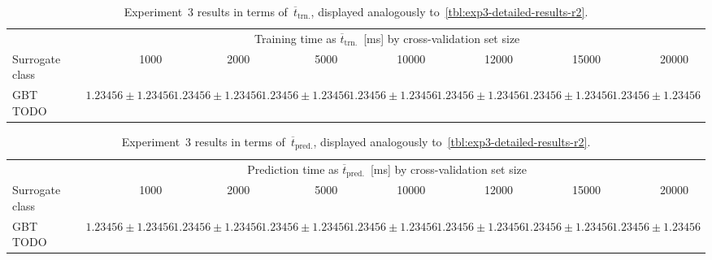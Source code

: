 \begin{table}[h]
	\centering
	{\footnotesize
		\begin{tabular}{lrrrrrrrr}
		\toprule
		{} & \multicolumn{7}{c}{Training time as $\overline{t}_{\text{trn.}}$~[ms] by cross-validation set size}\\
		\cmidrule(lr){2-8}
		Surrogate class
						& \num{1000}
						& \num{2000}
						& \num{5000}
						& \num{10000}
						& \num{12000}
						& \num{15000}
						& \num{20000}\\
		\midrule
		GBT TODO
						& $\num{1.23456} \pm \num{1.23456}$
						& $\num{1.23456} \pm \num{1.23456}$
						& $\num{1.23456} \pm \num{1.23456}$
						& $\num{1.23456} \pm \num{1.23456}$
						& $\num{1.23456} \pm \num{1.23456}$
						& $\num{1.23456} \pm \num{1.23456}$
						& $\num{1.23456} \pm \num{1.23456}$
		\\
		\bottomrule
		\end{tabular}
	}
	\caption{Experiment~3 results in terms of~$\overline{t}_{\text{trn.}}$,
	displayed analogously to~\cref{tbl:exp3-detailed-results-r2}.}
	\label{tbl:exp3-detailed-results-t-train}
\end{table}

\begin{table}[h]
	\centering
	{\footnotesize
		\begin{tabular}{lrrrrrrrr}
		\toprule
		{} & \multicolumn{7}{c}{Prediction time as $\overline{t}_{\text{pred.}}$~[ms] by cross-validation set size}\\
		\cmidrule(lr){2-8}
		Surrogate class
						& \num{1000}
						& \num{2000}
						& \num{5000}
						& \num{10000}
						& \num{12000}
						& \num{15000}
						& \num{20000}\\
		\midrule
		GBT TODO
						& $\num{1.23456} \pm \num{1.23456}$
						& $\num{1.23456} \pm \num{1.23456}$
						& $\num{1.23456} \pm \num{1.23456}$
						& $\num{1.23456} \pm \num{1.23456}$
						& $\num{1.23456} \pm \num{1.23456}$
						& $\num{1.23456} \pm \num{1.23456}$
						& $\num{1.23456} \pm \num{1.23456}$
		\\
		\bottomrule
		\end{tabular}
	}
	\caption{Experiment~3 results in terms of~$\overline{t}_{\text{pred.}}$,
	displayed analogously to~\cref{tbl:exp3-detailed-results-r2}.}
	\label{tbl:exp3-detailed-results-t-pred}
\end{table}
